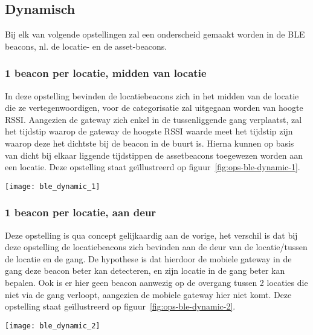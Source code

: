 \subsection{Dynamisch}

Bij elk van volgende opstellingen zal een onderscheid gemaakt worden in de BLE beacons, nl. de locatie- en de asset-beacons.

\subsubsection{1 beacon per locatie, midden van locatie}
\begin{minipage}{0.65\textwidth}
In deze opstelling bevinden de locatiebeacons zich in het midden van de locatie die ze vertegenwoordigen, voor de categorisatie zal uitgegaan worden van hoogte RSSI. Aangezien de gateway zich enkel in de tussenliggende gang verplaatst, zal het tijdstip waarop de gateway de hoogste RSSI waarde meet het tijdstip zijn waarop deze het dichtste bij de beacon in de buurt is. Hierna kunnen op basis van dicht bij elkaar liggende tijdstippen de assetbeacons toegewezen worden aan een locatie. Deze opstelling staat geïllustreerd op figuur~\ref{fig:ops-ble-dynamic-1}.
\end{minipage}
\hfill
\begin{minipage}{0.30\textwidth}
	\texttt{[image: ble\_dynamic\_1]}
	\label{fig:ops-ble-dynamic-1}
\end{minipage}

\subsubsection{1 beacon per locatie, aan deur}
\begin{minipage}{0.65\textwidth}
Deze opstelling is qua concept gelijkaardig aan de vorige, het verschil is dat bij deze opstelling de locatiebeacons zich bevinden aan de deur van de locatie/tussen de locatie en de gang. De hypothese is dat hierdoor de mobiele gateway in de gang deze beacon beter kan detecteren, en zijn locatie in de gang beter kan bepalen. Ook is er hier geen beacon aanwezig op de overgang tussen 2 locaties die niet via de gang verloopt, aangezien de mobiele gateway hier niet komt. Deze opstelling staat geïllustreerd op figuur~\ref{fig:ops-ble-dynamic-2}.
\end{minipage}
\hfill
\begin{minipage}{0.30\textwidth}
	\texttt{[image: ble\_dynamic\_2]}
	\label{fig:ops-ble-dynamic-2}
\end{minipage}

